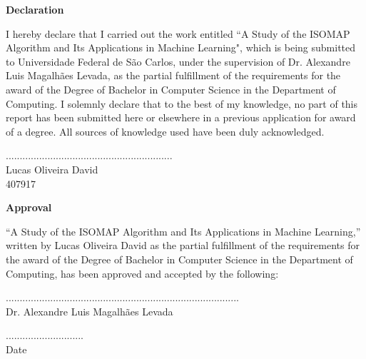 \documentclass[12pt]{report}
\begin{document}
	
\maketitle


\begin{center}
	\textbf{Declaration}
\end{center}

I hereby declare that I carried out the work entitled ``A Study of the ISOMAP Algorithm and Its Applications in Machine Learning", which is being submitted to Universidade Federal de São Carlos, under the supervision of Dr. Alexandre Luis Magalhães Levada, as the partial fulfillment of the requirements for the award of the Degree of Bachelor  in Computer Science in the Department of Computing.
I solemnly declare that to the best of my knowledge, no part of this report has been submitted here or elsewhere in a previous application for award of a degree. All sources of knowledge used have been duly acknowledged.

\vfill

\begin{center}
	............................................................\\
	Lucas Oliveira David\\
	407917	
\end{center}

\newpage
\begin{center}
	\textbf{Approval}
\end{center}

“A Study of the ISOMAP Algorithm and Its Applications in Machine Learning,” written by Lucas Oliveira David as the partial fulfillment of the requirements for the award of the Degree of Bachelor  in Computer Science in the Department of Computing, has been approved and accepted by the following:

\vfill

\begin{minipage}{.7\linewidth}
	....................................................................................\\
	Dr. Alexandre Luis Magalhães Levada
\end{minipage}%
\begin{minipage}{.3\linewidth}
	\begin{flushright}
		............................\\
		Date
	\end{flushright}
\end{minipage}\\[1.5cm]
\end{document}

